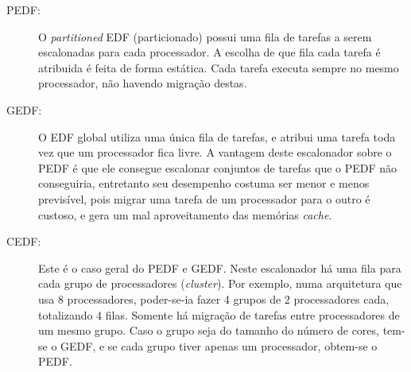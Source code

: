 \begin{description}

\item[PEDF:] O \emph{partitioned} EDF (particionado) possui uma fila de tarefas a serem escalonadas para cada processador. A escolha de que fila cada tarefa é atribuida é feita de forma estática. Cada tarefa executa sempre no mesmo processador, não havendo migração destas. 

\item[GEDF:] O EDF global utiliza uma única fila de tarefas, e atribui uma tarefa toda vez que um processador fica livre. A vantagem deste escalonador sobre o PEDF é que ele consegue escalonar conjuntos de tarefas que o PEDF não conseguiria, entretanto seu desempenho costuma ser menor e menos previsível, pois migrar uma tarefa de um processador para o outro é custoso, e gera um mal aproveitamento das memórias \emph{cache}.

\item[CEDF:] Este é o caso geral do PEDF e GEDF. Neste escalonador há uma fila para cada grupo de processadores (\emph{cluster}). Por exemplo, numa arquitetura que usa 8 processadores, poder-se-ia fazer 4 grupos de 2 processadores cada, totalizando 4 filas. Somente há migração de tarefas entre processadores de um mesmo grupo. Caso o grupo seja do tamanho do número de cores, tem-se o GEDF, e se cada grupo tiver apenas um processador, obtem-se o PEDF.

\end{description}



















